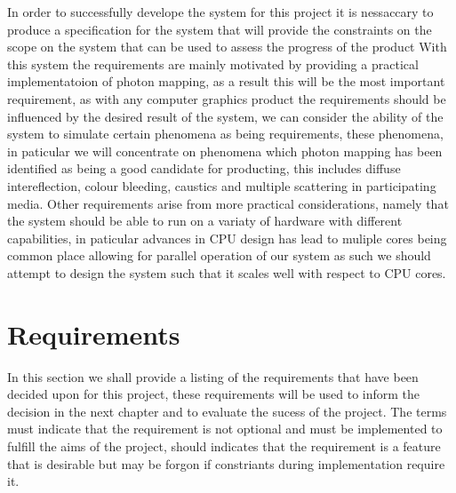 \label{chap:reqs}
In order to successfully develope the system for this project it is nessaccary to produce a specification for the system
that will provide the constraints on the scope on the system that can be used to assess the progress of the product
With this system the requirements are mainly motivated by providing a practical implementatoion of photon mapping, as a result
this will be the most important requirement, as with any computer graphics product the requirements should be influenced by the
desired result of the system, we can consider the ability of the system to simulate certain phenomena as being requirements,
these phenomena, in paticular we will concentrate on phenomena which photon mapping has been identified as being a good candidate
for producting, this includes diffuse intereflection, colour bleeding, caustics and multiple scattering in participating media.
Other requirements arise from more practical considerations, namely that the system should be able to run on a variaty of
hardware with different capabilities, in paticular advances in CPU design has lead to muliple cores being common place allowing
for parallel operation of our system as such we should attempt to design the system such that it scales well with respect
to CPU cores.

\section{Requirements}
In this section we shall provide a listing of the requirements that have been decided upon for this project, these
requirements will be used to inform the decision in the next chapter and to evaluate the sucess of the project.
The terms must indicate that the requirement is not optional and must be implemented to fulfill the aims of the project,
should indicates that the requirement is a feature that is desirable but may be forgon if constriants during implementation
require it.


